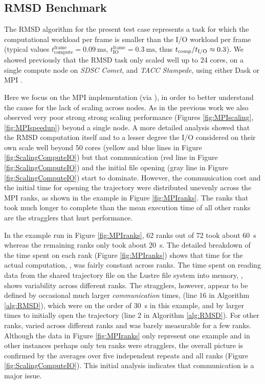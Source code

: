 \label{impl_exp}

\subsection{RMSD Benchmark}
\label{sec:RMSD}
The RMSD algorithm for the present test case represents a task for which the computational workload per frame is smaller than the I/O workload per frame (typical values $t_{\text{compute}}^{\text{frame}} = 0.09\ \text{ms}$, $t_{\text{IO}}^{\text{frame}} = 0.3\ \text{ms}$, thus ${t}_{\text{comp}}/{t}_{\text{I/O}} \approx 0.3$). 
We showed previously that the RMSD task only scaled well up to 24 cores, on a single compute node on \emph{SDSC Comet}, and \emph{TACC Stampede}, using either Dask or MPI \cite{Khoshlessan:2017ab}.

Here we focus on the MPI implementation (via  \cite{Dalcin:2011aa, Dalcin:2005aa}), in order to better understand the cause for the lack of scaling across nodes.
As in the previous work we also observed very poor strong strong scaling performance (Figures \ref{fig:MPIscaling}, \ref{fig:MPIspeedup}) beyond a single node.
A more detailed analysis showed that the RMSD computation itself and to a lesser degree the I/O considered on their own scale well beyond 50 cores (yellow and blue lines in Figure \ref{fig:ScalingComputeIO}) but that communication (red line in Figure \ref{fig:ScalingComputeIO}) and the initial file opening (gray line in Figure \ref{fig:ScalingComputeIO}) start to dominate.
However, the communication cost and the initial time for opening the trajectory were distributed unevenly across the MPI ranks, as shown in the example in Figure \ref{fig:MPIranks}. The ranks that took much longer to complete than the mean execution time of all other ranks are the stragglers that hurt performance.

In the example run in Figure \ref{fig:MPIranks}, 62 ranks out of 72 took about 60~s whereas the remaining ranks only took about 20~s. 
The detailed breakdown of the time spent on each rank (Figure \ref{fig:MPIranks}) shows that time
for the actual computation, \tcomp, was fairly constant across ranks. 
The time spent on reading data from the shared trajectory file on the Lustre file system into memory, \tIO, shows variability across different ranks. 
The stragglers, however, appear to be defined by occasional much larger \emph{communication} times, \tcomm (line 16 in Algorithm \ref{alg:RMSD}), which were on the order of 30~s in this example, and by larger times to initially open the trajectory (line 2 in Algorithm \ref{alg:RMSD}).
For other ranks, \tcomm varied across different ranks and was barely measurable for a few ranks.
Although the data in Figure \ref{fig:MPIranks} only represent one example and in other instances perhaps only ten ranks were stragglers, the overall picture is confirmed by the averages over five independent repeats and all ranks (Figure \ref{fig:ScalingComputeIO}).
This initial analysis indicates that communication is a major issue. 


